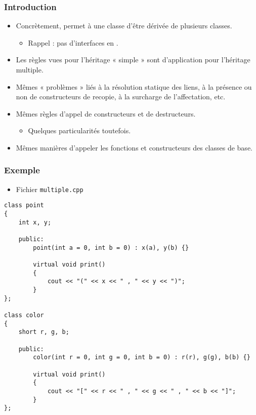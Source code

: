 \begin{frame}
\frametitle{Introduction}
\begin{itemize}[<+->]
\item Concrètement, permet à une classe d'être dérivée de plusieurs classes.
	\begin{itemize}
	\item Rappel : pas d'interfaces en \cpp.
	\end{itemize}
\item Les règles vues pour l'héritage « simple » sont d'application pour l'héritage multiple.
\item Mêmes « problèmes » liés à la résolution statique des liens, à la présence ou non de constructeurs de recopie, à la surcharge de l'affectation, etc.
\item Mêmes règles d'appel de constructeurs et de destructeurs.
	\begin{itemize}
	\item Quelques particularités toutefois.
	\end{itemize}
\item Mêmes manières d'appeler les fonctions et constructeurs des classes de base.
\end{itemize}
\end{frame}

\begin{frame}[containsverbatim]
\frametitle{Exemple}
\begin{itemize}
\item Fichier \texttt{multiple.cpp}
\end{itemize}
\begin{lstlisting}
class point
{
	int x, y;
	
	public:
		point(int a = 0, int b = 0) : x(a), y(b) {}

		virtual void print()
		{
			cout << "(" << x << " , " << y << ")";			
		}
};

class color
{
	short r, g, b;

	public:
		color(int r = 0, int g = 0, int b = 0) : r(r), g(g), b(b) {}

		virtual void print()
		{
			cout << "[" << r << " , " << g << " , " << b << "]";
		}
};
\end{lstlisting}
\end{frame}

